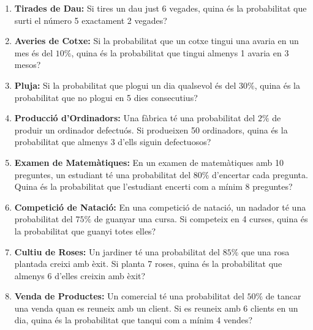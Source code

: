 \documentclass[12pt]{article}
\begin{document}
\begin{exercici}[title=Exercicis proposats amb solucions] \noindent 
\begin{enumerate}
    \item \textbf{Tirades de Dau:}  
    Si tires un dau just 6 vegades, quina és la probabilitat que surti el número 5 exactament 2 vegades?  

    \item \textbf{Averies de Cotxe:}  
    Si la probabilitat que un cotxe tingui una avaria en un mes és del $10\%$, quina és la probabilitat que tingui almenys 1 avaria en 3 mesos?  

    \item \textbf{Pluja:}  
    Si la probabilitat que plogui un dia qualsevol és del $30\%$, quina és la probabilitat que no plogui en 5 dies consecutius?  

    \item \textbf{Producció d'Ordinadors:}  
    Una fàbrica té una probabilitat del $2\%$ de produir un ordinador defectuós. Si produeixen 50 ordinadors, quina és la probabilitat que almenys 3 d'ells siguin defectuosos?  

    \item \textbf{Examen de Matemàtiques:}  
    En un examen de matemàtiques amb 10 preguntes, un estudiant té una probabilitat del $80\%$ d'encertar cada pregunta. Quina és la probabilitat que l'estudiant encerti com a mínim 8 preguntes?  

    \item \textbf{Competició de Natació:}  
    En una competició de natació, un nadador té una probabilitat del $75\%$ de guanyar una cursa. Si competeix en 4 curses, quina és la probabilitat que guanyi totes elles?  

    \item \textbf{Cultiu de Roses:}  
    Un jardiner té una probabilitat del $85\%$ que una rosa plantada creixi amb èxit. Si planta 7 roses, quina és la probabilitat que almenys 6 d'elles creixin amb èxit?  

    \item \textbf{Venda de Productes:}  
    Un comercial té una probabilitat del $50\%$ de tancar una venda quan es reuneix amb un client. Si es reuneix amb 6 clients en un dia, quina és la probabilitat que tanqui com a mínim 4 vendes?  


\end{enumerate}
\end{exercici}
\end{document}
